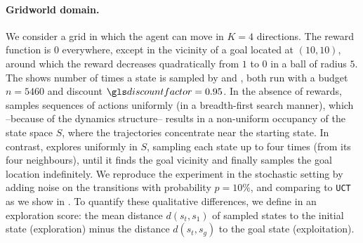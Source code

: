 \paragraph{Gridworld domain.}
We consider a grid in which the agent can move in $K=4$ directions. The reward function is $0$ everywhere, except in the vicinity of a goal located at $(10, 10)$, around which the reward decreases quadratically from $1$ to $0$ in a ball of radius $5$. %
The  shows number of times a state is sampled by \OPD and \GBOPD, both run with a budget $n = 5460$ and discount $\discount=0.95$. In the absence of rewards, \OPD samples sequences of actions uniformly (in a breadth-first search manner), which --because of the dynamics structure-- results in a non-uniform occupancy of the state space $S$, where the trajectories concentrate near the starting state. In contrast, \GBOPD explores uniformly in $S$, sampling each state up to four times (from its four  neighbours), until it finds the goal vicinity and finally samples the goal location indefinitely. We reproduce the experiment in the stochastic setting by adding noise on the transitions with probability $p=10\%$, and comparing \GBOP to \texttt{UCT} as we show in . To quantify these qualitative differences, we define in  an exploration score: the mean distance $d(s_t, s_1)$ of sampled states to the initial state (exploration) minus the distance $d(s_t, s_g)$ to the goal state (exploitation).

